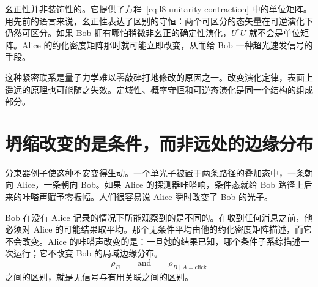 幺正性并非装饰性的。它提供了方程~\eqref{eq:l8-unitarity-contraction} 中的单位矩阵。用先前的语言来说，幺正性表达了区别的守恒：两个可区分的态矢量在可逆演化下仍然可区分。如果 Bob 拥有哪怕稍微非幺正的确定性演化，\(U^\dagger U\) 就不会是单位矩阵。Alice 的约化密度矩阵那时就可能立即改变，从而给 Bob 一种超光速发信号的手段。

这种紧密联系是量子力学难以零敲碎打地修改的原因之一。改变演化定律，表面上遥远的原理也可能随之失效。定域性、概率守恒和可逆态演化是同一个结构的组成部分。

\begin{classroomqa}
\end{classroomqa}

\section{坍缩改变的是条件，而非远处的边缘分布}

分束器例子使这种不安变得生动。一个单光子被置于两条路径的叠加态中，一条朝向 Alice，一条朝向 Bob。如果 Alice 的探测器咔嗒响，条件态就给 Bob 路径上后来的咔嗒声赋予零振幅。人们很容易说 Alice 瞬时改变了 Bob 的光子。

Bob 在没有 Alice 记录的情况下所能观察到的是不同的。在收到任何消息之前，他必须对 Alice 的可能结果取平均。那个无条件平均由他的约化密度矩阵描述，而它不会改变。Alice 的咔嗒声改变的是：一旦她的结果已知，哪个条件子系综描述一次运行；它不改变 Bob 的局域边缘分布。
\begin{equation}
\rho_B
\qquad\text{and}\qquad
\rho_{B\mid A=\text{click}}
\end{equation}
之间的区别，就是无信号与有用关联之间的区别。

\begin{classroomqa}
\end{classroomqa}

\begin{classroomqa}
\end{classroomqa}

